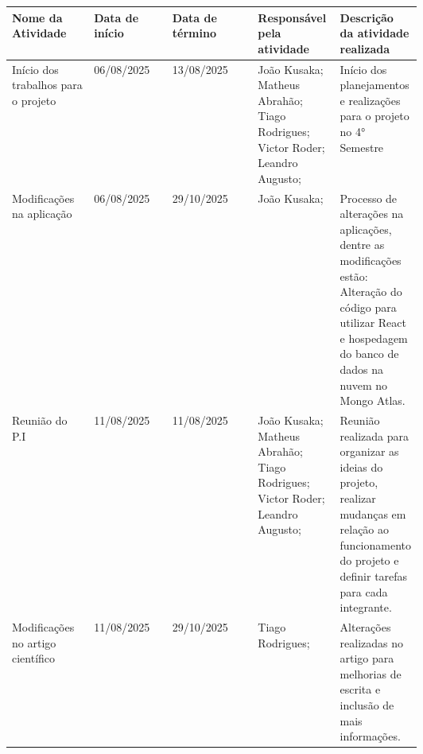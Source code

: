\documentclass[
landscape,
  a4paper,
  12pt,
  english,
  brazilian,
]{article}
\begin{document}
 \begin{table}[]
\centering
 

\begin{tabular}{|>{\raggedright\arraybackslash}p{0.2\linewidth}|l|l|>{\raggedright\arraybackslash}p{0.2\linewidth}|>{\raggedright\arraybackslash}p{0.2\linewidth}|}
\hline
Nome da Atividade & Data de início & Data de término & Responsável pela atividade & Descrição da atividade realizada \\\hline
                  Início dos trabalhos para o projeto&                            06/08/2025&                13/08/2025&                  João Kusaka; Matheus Abrahão; Tiago Rodrigues; Victor Roder; Leandro Augusto;&                                  Início dos planejamentos e realizações para o projeto no 4° Semestre\\ \hline
                  Modificações na aplicação&                            06/08/2025&                29/10/2025&                 João Kusaka; &                                 Processo de alterações na aplicações, dentre as modificações estão: Alteração do código para utilizar React e hospedagem do banco de dados na nuvem no Mongo Atlas. \\ \hline 
 Reunião do P.I&                            11/08/2025&                11/08/2025&                 João Kusaka; Matheus Abrahão; Tiago Rodrigues; Victor Roder; Leandro Augusto;&                                 Reunião realizada para organizar as ideias do projeto, realizar mudanças em relação ao funcionamento do projeto e definir tarefas para cada integrante.\\ \hline
                  Modificações no artigo científico &                            11/08/2025&                29/10/2025&                 Tiago Rodrigues;&                                  Alterações realizadas no artigo para melhorias de escrita e inclusão de mais informações.\\ \hline
                 
\end{tabular}


\end{table}
\end{document}
